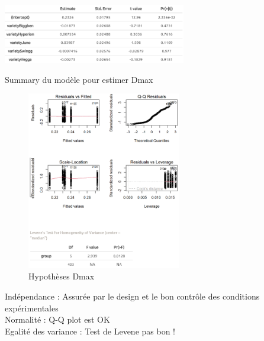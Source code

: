 \newpage

\label{an:Dmax}
\begin{table}[ht]
\centering
\includegraphics[width=0.6\textwidth]{Image/summary Dmax.png}
\caption{Summary du modèle pour estimer Dmax}
\end{table}
\begin{figure}[ht]
\centering
\includegraphics[width=0.6\textwidth]{Image/hypothese Dmax.png}
\caption{Hypothèses Dmax}
\end{figure}
\noindent Indépendance : Assurée par le design et le bon contrôle des conditions expérimentales \\
Normalité : Q-Q plot est OK \\
Egalité des variance : Test de Levene pas bon !

\newpage

